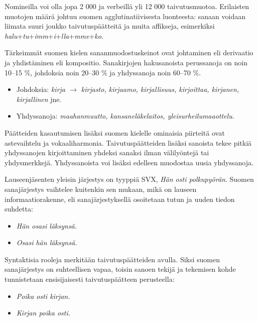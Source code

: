 \documentclass{../../metanetpaper}
\begin{document}
\begin{Parallel}[c]{79mm}{78mm}
{Nomineilla voi olla jopa 2 000 ja verbeillä yli 12 000 taivutusmuotoa.
Erilaisten muotojen määrä johtuu suomen agglutinatiivisesta luonteesta: sanaan
voidaan liimata suuri joukko taivutuspäätteitä ja muita affikseja, esimerkiksi
\textit{halu}+\textit{tu}+\textit{imm}+\textit{i}+\textit{lla}+\textit{mme}+\textit{ko}.

Tärkeimmät suomen kielen sananmuodostuskeinot ovat johtaminen eli derivaatio ja
yhdistäminen eli kompositio. Sanakirjojen hakusanoista perussanoja on noin
10–15 \%, johdoksia noin 20–30 \% ja yhdyssanoja noin 60–70 \%.
\begin{itemize}
\item Johdoksia: \textit{kirja $\to$ kirjasto, kirjaamo, kirjallisuus, kirjoittaa, kirjanen,
    kirjallinen} jne.

\item Yhdyssanoja: \textit{maahanmuutto, kansaneläkelaitos, yleisurheilumaaottelu.}
\end{itemize}
Päätteiden kasautumisen lisäksi suomen kielelle ominaisia piirteitä ovat
astevaihtelu ja vokaaliharmonia. Taivutuspäätteiden lisäksi sanoista tekee
pitkiä yhdyssanojen kirjoittaminen yhdeksi sanaksi ilman välilyöntejä tai
yhdysmerkkejä. Yhdyssanoista voi lisäksi edelleen muodostaa uusia yhdyssanoja.

Lauseenjäsenten yleisin järjestys on tyyppiä SVX, \textit{Hän osti polkupyörän}. Suomen
sanajärjestys vaihtelee kuitenkin sen mukaan, mikä on lauseen
informaatiorakenne, eli sanajärjestyksellä osoitetaan tutun ja uuden tiedon
suhdetta:
\begin{itemize}
\item \textit{Hän osasi läksynsä.}

\item \textit{Osasi hän läksynsä.}
\end{itemize}

Syntaktisia rooleja merkitään taivutuspäätteiden avulla. Siksi suomen
sanajärjestys on suhteellisen vapaa, toisin sanoen tekijä ja tekemisen kohde
tunnistetaan ensisijaisesti taivutuspäätteen perusteella:
\begin{itemize}
\item \textit{Poika osti kirjan.}

\item \textit{Kirjan poika osti.}
\end{itemize}
}

\end{Parallel}
\end{document}

